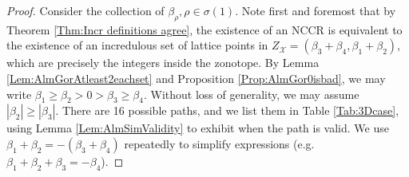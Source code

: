 \documentclass[reqno, 12pt]{amsart}
\theoremstyle{definition}
\numberwithin{equation}{section}
\begin{document}
\begin{proof}
Consider the collection of $\beta_\rho, \rho\in \sigma(1)$. Note first and foremost that by Theorem \ref{Thm:Incr definitions agree}, the existence of an NCCR is equivalent to the existence of an incredulous set of lattice points in $Z_\mathcal{X}=(\beta_3+\beta_4,\beta_1+\beta_2)$, which are precisely the integers inside the zonotope. By Lemma \ref{Lem:AlmGorAtleast2eachset} and Proposition \ref{Prop:AlmGor0isbad}, we may write $\beta_1\ge \beta_2>0>\beta_3\ge \beta_4$. Without loss of generality, we may assume $|\beta_2|\ge |\beta_3|$. There are 16 possible paths, and we list them in Table \ref{Tab:3Dcase}, using Lemma \ref{Lem:AlmSimValidity} to exhibit when the path is valid. We use $\beta_1+\beta_2=-(\beta_3+\beta_4)$ repeatedly to simplify expressions (e.g. $\beta_1+\beta_2+\beta_3=-\beta_4$).


\end{proof}
\end{document}
